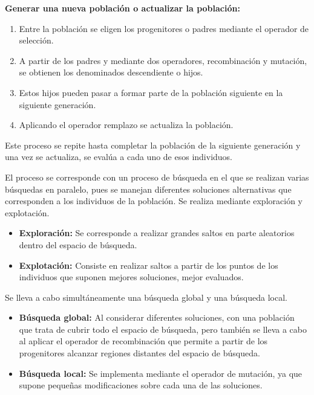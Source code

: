 \documentclass[12pt, twoside, openright]{report} %
\begin{document}
\textbf{Generar una nueva población o actualizar la población:}
\begin{enumerate}
	\item Entre la población se eligen los progenitores o padres mediante el operador de selección.
	\item A partir de los padres y mediante dos operadores, recombinación y mutación, se obtienen los denominados descendiente o hijos.
	\item Estos hijos pueden pasar a formar parte de la población siguiente en la siguiente generación.
	\item Aplicando el operador remplazo se actualiza la población.
\end{enumerate}
Este proceso se repite hasta completar la población de la siguiente generación y una vez se actualiza, se evalúa a cada uno de esos individuos.

El proceso se corresponde con un proceso de búsqueda en el que se realizan varias búsquedas en paralelo, pues se manejan diferentes soluciones alternativas que corresponden a los individuos de la población. Se realiza mediante exploración y explotación.
\begin{itemize}
	\item \textbf{Exploración:} Se corresponde a realizar grandes saltos en parte aleatorios dentro del espacio de búsqueda.
	\item \textbf{Explotación:} Consiste en realizar saltos a partir de los puntos de los individuos que suponen mejores soluciones, mejor evaluados.
\end{itemize}

Se lleva a cabo simultáneamente una búsqueda global y una búsqueda local.
\begin{itemize}
	\item \textbf{Búsqueda global:} Al considerar diferentes soluciones, con una población que trata de cubrir todo el  espacio de búsqueda, pero también se lleva a cabo al aplicar el operador de recombinación que permite a partir de los progenitores alcanzar regiones distantes del espacio de búsqueda.
	\item \textbf{Búsqueda local:} Se implementa mediante el operador de mutación, ya que supone pequeñas modificaciones sobre cada una de las soluciones.
\end{itemize}
\end{document}
